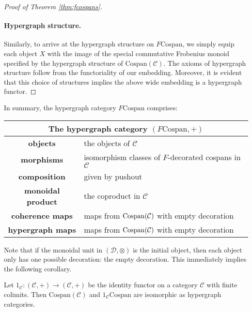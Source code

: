 \begin{proof}[Proof of Theorem \ref{thm:fcospans}]
\paragraph{Hypergraph structure.}
Similarly, to arrive at the hypergraph structure on \linebreak
$F\mathrm{Cospan}$, we simply equip each object $X$ with the image of the
special commutative Frobenius monoid specified by the hypergraph structure of
$\mathrm{Cospan(\mathcal{C})}$. The axioms of hypergraph structure follow from
the functoriality of our embedding. Moreover, it is evident that this choice of
structures implies the above wide embedding is a hypergraph functor.
\end{proof}

In summary, the hypergraph category $F\mathrm{Cospan}$ comprises:
\smallskip

\begin{center}
  \begin{tabular}{| c | p{} |}
    \hline
    \multicolumn{2}{|c|}{The hypergraph category $(F\mathrm{Cospan},+)$} \\
    \hline
    \textbf{objects} & the objects of $\mathcal C$ \\ 
    \textbf{morphisms} & isomorphism classes of $F$-decorated cospans in
    $\mathcal C$\\ 
    \textbf{composition} & given by pushout \\
    \textbf{monoidal product} & the coproduct in $\mathcal C$ \\
    \textbf{coherence maps} &  maps from $\operatorname{{Cospan}}(\mathcal C)$ with empty decoration \\
    \textbf{hypergraph maps} & maps from $\operatorname{{Cospan}}(\mathcal C)$ with empty decoration
    \\
    \hline
  \end{tabular}
\end{center}
\smallskip

Note that if the monoidal unit in $(\mathcal D,\otimes)$ is the initial object,
then each object only has one possible decoration: the empty decoration. This
immediately implies the following corollary.
\begin{corollary}
  Let $1_{\mathcal C}\colon (\mathcal C,+) \to (\mathcal C,+)$ be the identity functor
  on a category $\mathcal C$ with finite colimits. Then
  $\mathrm{Cospan}(\mathcal C)$ and $1_{\mathcal C}\mathrm{Cospan}$ are
  isomorphic as hypergraph categories.
\end{corollary}

